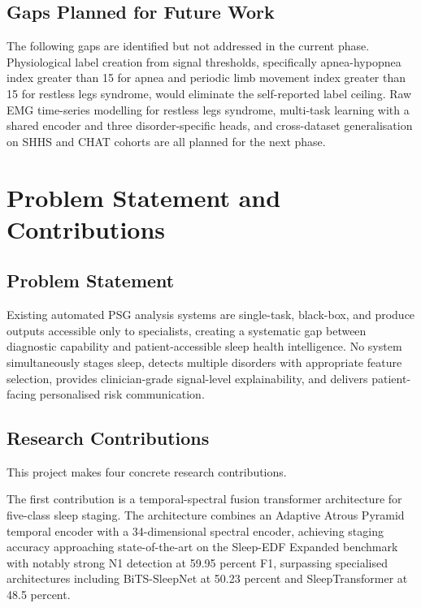 \subsection{Gaps Planned for Future Work}

The following gaps are identified but not addressed in the current phase. Physiological label creation from signal thresholds, specifically apnea-hypopnea index greater than 15 for apnea and periodic limb movement index greater than 15 for restless legs syndrome, would eliminate the self-reported label ceiling. Raw EMG time-series modelling for restless legs syndrome, multi-task learning with a shared encoder and three disorder-specific heads, and cross-dataset generalisation on SHHS and CHAT cohorts are all planned for the next phase.

\section{Problem Statement and Contributions}

\subsection{Problem Statement}

Existing automated PSG analysis systems are single-task, black-box, and produce outputs accessible only to specialists, creating a systematic gap between diagnostic capability and patient-accessible sleep health intelligence. No system simultaneously stages sleep, detects multiple disorders with appropriate feature selection, provides clinician-grade signal-level explainability, and delivers patient-facing personalised risk communication.

\subsection{Research Contributions}

This project makes four concrete research contributions.

The first contribution is a temporal-spectral fusion transformer architecture for five-class sleep staging. The architecture combines an Adaptive Atrous Pyramid temporal encoder with a 34-dimensional spectral encoder, achieving staging accuracy approaching state-of-the-art on the Sleep-EDF Expanded benchmark with notably strong N1 detection at 59.95 percent F1, surpassing specialised architectures including BiTS-SleepNet at 50.23 percent and SleepTransformer at 48.5 percent.

